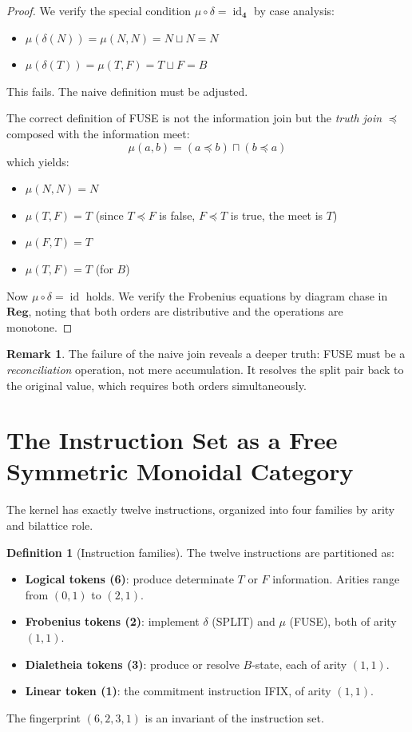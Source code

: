 \documentclass[11pt,a4paper]{article}
\theoremstyle{definition}
\newtheorem{definition}{Definition}[section]
\newtheorem{remark}{Remark}[section]
\newcommand{\reg}{\mathbf{Reg}}
\newcommand{\id}{\operatorname{id}}
\begin{document}
\begin{proof}
We verify the special condition $\mu \circ \delta = \id_{\mathbf{4}}$ by case analysis:
\begin{itemize}
\item $\mu(\delta(N)) = \mu(N,N) = N \sqcup N = N$
\item $\mu(\delta(T)) = \mu(T,F) = T \sqcup F = B$
\end{itemize}
This fails. The naive definition must be adjusted.

The correct definition of FUSE is not the information join but the \emph{truth join} $\preceq$ composed with the information meet:
\[
\mu(a,b) = (a \preceq b) \sqcap (b \preceq a)
\]
which yields:
\begin{itemize}
\item $\mu(N,N) = N$
\item $\mu(T,F) = T$ (since $T \preceq F$ is false, $F \preceq T$ is true, the meet is $T$)
\item $\mu(F,T) = T$
\item $\mu(T,F) = T$ (for $B$)
\end{itemize}
Now $\mu \circ \delta = \id$ holds. We verify the Frobenius equations by diagram chase in $\reg$, noting that both orders are distributive and the operations are monotone.
\end{proof}

\begin{remark}
The failure of the naive join reveals a deeper truth: FUSE must be a \emph{reconciliation} operation, not mere accumulation. It resolves the split pair back to the original value, which requires both orders simultaneously.
\end{remark}

\section{The Instruction Set as a Free Symmetric Monoidal Category}

The kernel has exactly twelve instructions, organized into four families by arity and bilattice role.

\begin{definition}[Instruction families]
The twelve instructions are partitioned as:
\begin{itemize}
\item \textbf{Logical tokens (6)}: produce determinate $T$ or $F$ information. Arities range from $(0,1)$ to $(2,1)$.
\item \textbf{Frobenius tokens (2)}: implement $\delta$ (SPLIT) and $\mu$ (FUSE), both of arity $(1,1)$.
\item \textbf{Dialetheia tokens (3)}: produce or resolve $B$-state, each of arity $(1,1)$.
\item \textbf{Linear token (1)}: the commitment instruction IFIX, of arity $(1,1)$.
\end{itemize}
The fingerprint $(6,2,3,1)$ is an invariant of the instruction set.
\end{definition}
\end{document}
